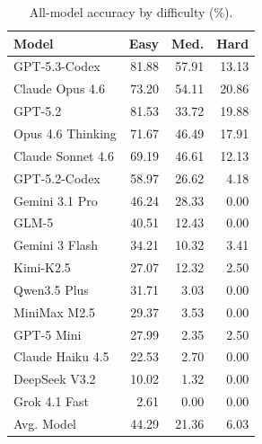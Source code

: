 \begin{table}[!h]
\centering
\caption{All-model accuracy by difficulty (\%).}
\label{tab:all_model_difficulty_appendix}
\small
\setlength{\tabcolsep}{2pt}
\renewcommand{\arraystretch}{0.9}
\begin{tabular}{@{}lrrr@{}}
\toprule
\textbf{Model} & \textbf{Easy} & \textbf{Med.} & \textbf{Hard} \\
\midrule
GPT-5.3-Codex & 81.88 & 57.91 & 13.13 \\
Claude Opus 4.6 & 73.20 & 54.11 & 20.86 \\
GPT-5.2 & 81.53 & 33.72 & 19.88 \\
Opus 4.6 Thinking & 71.67 & 46.49 & 17.91 \\
Claude Sonnet 4.6 & 69.19 & 46.61 & 12.13 \\
GPT-5.2-Codex & 58.97 & 26.62 & 4.18 \\
Gemini 3.1 Pro & 46.24 & 28.33 & 0.00 \\
GLM-5 & 40.51 & 12.43 & 0.00 \\
Gemini 3 Flash & 34.21 & 10.32 & 3.41 \\
Kimi-K2.5 & 27.07 & 12.32 & 2.50 \\
Qwen3.5 Plus & 31.71 & 3.03 & 0.00 \\
MiniMax M2.5 & 29.37 & 3.53 & 0.00 \\
GPT-5 Mini & 27.99 & 2.35 & 2.50 \\
Claude Haiku 4.5 & 22.53 & 2.70 & 0.00 \\
DeepSeek V3.2 & 10.02 & 1.32 & 0.00 \\
Grok 4.1 Fast & 2.61 & 0.00 & 0.00 \\
Avg. Model & 44.29 & 21.36 & 6.03 \\
\bottomrule
\end{tabular}
\end{table}

